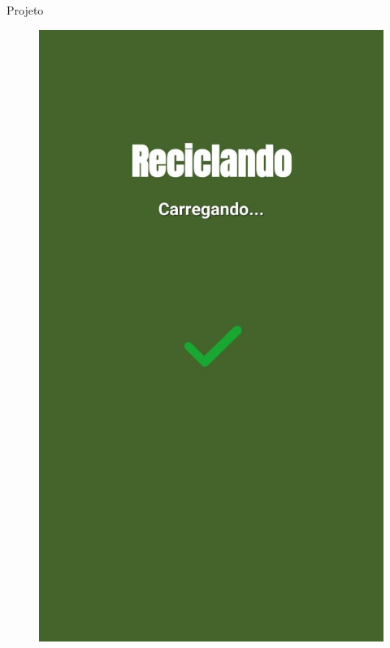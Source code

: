\documentclass[
	12pt,				%
	openright,			%
	twoside,			%
	a4paper,			%
	english,			%
	french,				%
	spanish,			%
	brazil				%
	]{abntex2}
\begin{document}
\begin{chapter}{Projeto}
\begin{figure}[htb]
\begin{minipage}{0.45\textwidth}
    \includegraphics[scale=0.35]{media/tela_splash_2.jpg}
     \label{fig:tela_splash_2_app}
  \end{minipage}
\end{figure}


\end{chapter}
\end{document}
